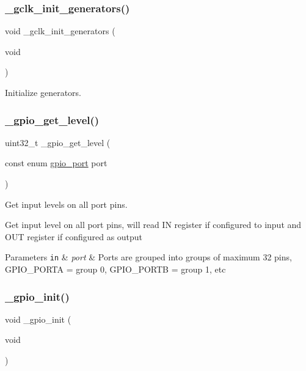 \subsubsection{\texorpdfstring{\+\_\+gclk\+\_\+init\+\_\+generators()}{\_gclk\_init\_generators()}}
{\footnotesize\ttfamily void \+\_\+gclk\+\_\+init\+\_\+generators (\begin{DoxyParamCaption}\item[{void}]{ }\end{DoxyParamCaption})}



Initialize generators. 

\mbox{\label{group___h_p_l_gaaa9499706a1ad34050473faacabc89af}} 
\subsubsection{\texorpdfstring{\+\_\+gpio\+\_\+get\+\_\+level()}{\_gpio\_get\_level()}}
{\footnotesize\ttfamily uint32\+\_\+t \+\_\+gpio\+\_\+get\+\_\+level (\begin{DoxyParamCaption}\item[{const enum \hyperlink{group___h_p_l_ga6d50d8c4b17ff573c07340d4d7965bc1}{gpio\+\_\+port}}]{port }\end{DoxyParamCaption})}



Get input levels on all port pins. 

Get input level on all port pins, will read IN register if configured to input and O\+UT register if configured as output


\begin{DoxyParams}[1]{Parameters}
\mbox{\tt in}  & {\em port} & Ports are grouped into groups of maximum 32 pins, G\+P\+I\+O\+\_\+\+P\+O\+R\+TA = group 0, G\+P\+I\+O\+\_\+\+P\+O\+R\+TB = group 1, etc \\
\hline
\end{DoxyParams}
\mbox{\label{group___h_p_l_ga6e226919d4a3ee84599b55a32597e284}} 
\subsubsection{\texorpdfstring{\+\_\+gpio\+\_\+init()}{\_gpio\_init()}}
{\footnotesize\ttfamily void \+\_\+gpio\+\_\+init (\begin{DoxyParamCaption}\item[{void}]{ }\end{DoxyParamCaption})}



